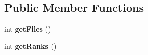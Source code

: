 \subsection*{Public Member Functions}
\begin{DoxyCompactItemize}
\item 
int {\bfseries get\+Files} ()\hypertarget{classedu_1_1xwei12_1_1chess_1_1_rectangle_board_abb61689f6b76caa6caf8f5249b75fd78}{}\label{classedu_1_1xwei12_1_1chess_1_1_rectangle_board_abb61689f6b76caa6caf8f5249b75fd78}

\item 
int {\bfseries get\+Ranks} ()\hypertarget{classedu_1_1xwei12_1_1chess_1_1_rectangle_board_a85ea9a24fc63edc1cbcb077ea46f0ae3}{}\label{classedu_1_1xwei12_1_1chess_1_1_rectangle_board_a85ea9a24fc63edc1cbcb077ea46f0ae3}


\end{DoxyCompactItemize}
